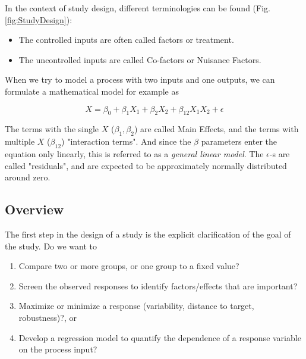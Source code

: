In the context of study design, different terminologies can be found (Fig. \ref{fig:StudyDesign}):

\begin{itemize}
    \item{The controlled inputs are often called \glspl{factor} or
            \gls{treatment}.}
    \item{The uncontrolled inputs are called Co-factors or
            Nuisance Factors.}
\end{itemize}

When we try to model a process with two inputs and one outputs, we can
formulate a mathematical model for example as

\begin{equation}
    X = \beta_0 + \beta_1 X_1 + \beta_2 X_2 + \beta_{12} X_1 X_2 + \epsilon
\end{equation}

The terms with the single $X$ ($\beta_1, \beta_2$) are called Main Effects, and the terms with multiple $X$  ($\beta_{12}$) "interaction terms". And since the $\beta$
parameters enter the equation only linearly, this is referred to as a \emph{general linear model}. The $\epsilon$-s are called "\glspl{residual}", and are expected to be approximately normally distributed around zero.

\subsection{Overview}

The first step in the design of a study is the explicit clarification of the goal of the study. Do we want to

\begin{enumerate}
    \item{Compare two or more groups, or one group to a fixed value?}
    \item{Screen the observed responses to identify
            factors/effects that are important?}
    \item{Maximize or minimize a response (variability, distance to target,
            robustness)?, or}
    \item{Develop a regression model to quantify the dependence of a
            response variable on the process input?}
\end{enumerate}

